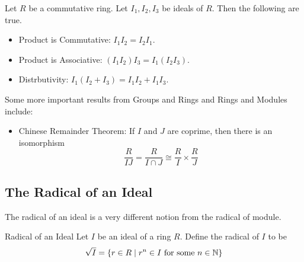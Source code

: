 \documentclass[a4paper]{article}
\begin{document}
\begin{lmm}{}{} Let $R$ be a commutative ring. Let $I_1,I_2,I_3$ be ideals of $R$. Then the following are true. 
\begin{itemize}
\item Product is Commutative: $I_1I_2=I_2I_1$. 
\item Product is Associative: $(I_1I_2)I_3=I_1(I_2I_3)$. 
\item Distrbutivity: $I_1(I_2+I_3)=I_1I_2+I_1I_3$. 
\end{itemize}
\end{lmm}

Some more important results from Groups and Rings and Rings and Modules include: 
\begin{itemize}
\item Chinese Remainder Theorem: If $I$ and $J$ are coprime, then there is an isomorphism $$\frac{R}{IJ}=\frac{R}{I\cap J}\cong\frac{R}{I}\times\frac{R}{J}$$
\end{itemize}

\subsection{The Radical of an Ideal}
The radical of an ideal is a very different notion from the radical of module. 

\begin{defn}{Radical of an Ideal}{} Let $I$ be an ideal of a ring $R$. Define the radical of $I$ to be $$\sqrt{I}=\{r\in R\;|\;r^n\in I\text{ for some }n\in\mathbb{N}\}$$
\end{defn}
\end{document}
